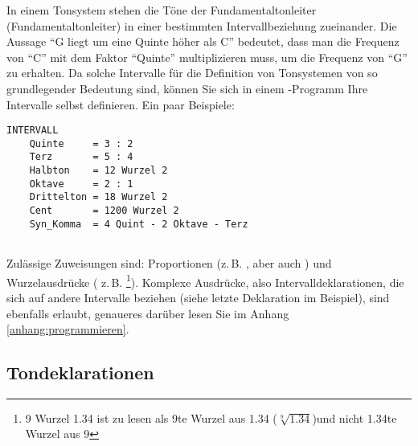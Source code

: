 In einem Tonsystem stehen die Töne der Fundamentaltonleiter (Fundamentaltonleiter)
in einer bestimmten Intervallbeziehung zueinander. Die Aussage "`G
liegt um eine Quinte höher als C"' bedeutet, dass man die Frequenz
von "`C"' mit dem Faktor "`Quinte"' multiplizieren muss, um die
Frequenz von "`G"' zu erhalten. Da solche Intervalle für die
Definition von Tonsystemen von so grundlegender Bedeutung sind,
können Sie sich in einem \mutabor{}-Programm Ihre
Intervalle selbst definieren. Ein paar Beispiele:
\begin{verbatim}
INTERVALL
    Quinte     = 3 : 2
    Terz       = 5 : 4
    Halbton    = 12 Wurzel 2
    Oktave     = 2 : 1
    Drittelton = 18 Wurzel 2
    Cent       = 1200 Wurzel 2
    Syn_Komma  = 4 Quint - 2 Oktave - Terz
  
\end{verbatim}
 Zulässige Zuweisungen sind: Proportionen
(z.\,B. , aber auch ) und Wurzelausdrücke (
z.\,B. \footnote{9 Wurzel 1.34 ist zu lesen als 9te
  Wurzel aus 1.34 ($\sqrt[9]{1.34}$)und nicht 1.34te Wurzel aus 9}).
Komplexe Ausdrücke, also Intervalldeklarationen, die sich auf andere
Intervalle beziehen (siehe letzte Deklaration im Beispiel), sind
ebenfalls erlaubt, genaueres darüber lesen Sie im Anhang
\ref{anhang:programmieren}.

\subsection{Tondeklarationen}\label{sec:tondeklarationen}

